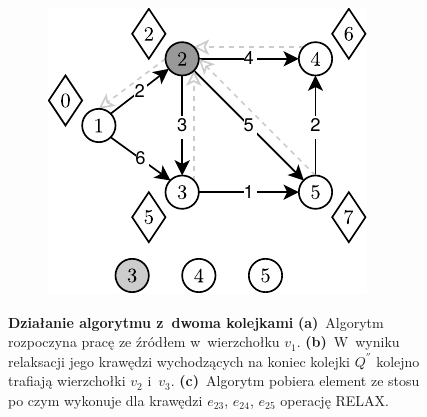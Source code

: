 \begin{figure}[!htbp]
\begin{subfigure}[b]{0.3\textwidth}
		\caption{}
		\label{fig:exampleDQQ:b}
	\end{subfigure}
	\hfill
	\begin{subfigure}[b]{0.3\textwidth}
		\includegraphics[width=\textwidth]{Chapter_III/GRAPH-GROWTH-2Q-Example/c.pdf}
		\caption{}
		\label{fig:exampleDQQ:c}
	\end{subfigure}
	\hfill\null
	\caption{
		\textbf{Działanie algorytmu z~dwoma kolejkami}
		\textbf{(a)}~Algorytm rozpoczyna pracę ze źródłem w~wierzchołku $v_{1}$.
		\textbf{(b)}~W~wyniku relaksacji jego krawędzi wychodzących na koniec kolejki $Q^{''}$ kolejno trafiają wierzchołki $v_{2}$ i~$v_{3}$.
		\textbf{(c)}~Algorytm pobiera element ze stosu po czym wykonuje dla krawędzi $e_{23}$, $e_{24}$, $e_{25}$ operację \textsc{RELAX}.
	}
	\label{fig:exampleDQQ1}
\end{figure}

